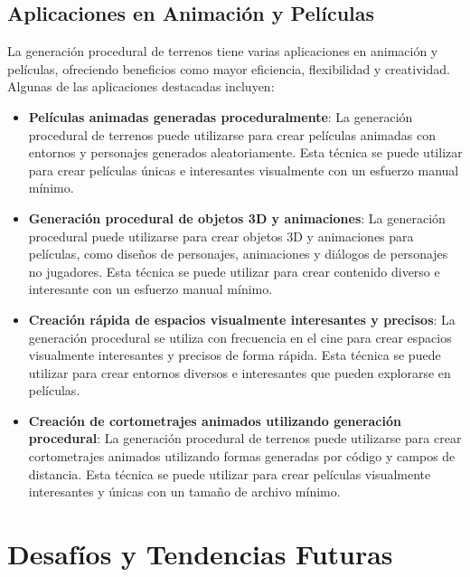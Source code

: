 \subsection{Aplicaciones en Animación y Películas}

La generación procedural de terrenos tiene varias aplicaciones en animación y películas, ofreciendo beneficios como mayor eficiencia, flexibilidad y creatividad. Algunas de las aplicaciones destacadas incluyen:

\begin{itemize}
    \item \textbf{Películas animadas generadas proceduralmente}: La generación procedural de terrenos puede utilizarse para crear películas animadas con entornos y personajes generados aleatoriamente. Esta técnica se puede utilizar para crear películas únicas e interesantes visualmente con un esfuerzo manual mínimo\cite{ProcedurallyGeneratedAnimatedFilms}.
    
    \item \textbf{Generación procedural de objetos 3D y animaciones}: La generación procedural puede utilizarse para crear objetos 3D y animaciones para películas, como diseños de personajes, animaciones y diálogos de personajes no jugadores. Esta técnica se puede utilizar para crear contenido diverso e interesante con un esfuerzo manual mínimo\cite{ProceduralGeneration3DObjects}.
    
    \item \textbf{Creación rápida de espacios visualmente interesantes y precisos}: La generación procedural se utiliza con frecuencia en el cine para crear espacios visualmente interesantes y precisos de forma rápida. Esta técnica se puede utilizar para crear entornos diversos e interesantes que pueden explorarse en películas\cite{CreatingVisuallyInterestingSpaces}.
    
    \item \textbf{Creación de cortometrajes animados utilizando generación procedural}: La generación procedural de terrenos puede utilizarse para crear cortometrajes animados utilizando formas generadas por código y campos de distancia. Esta técnica se puede utilizar para crear películas visualmente interesantes y únicas con un tamaño de archivo mínimo\cite{ShortAnimatedMoviesProceduralGeneration}.
\end{itemize}

\section{Desafíos y Tendencias Futuras}

